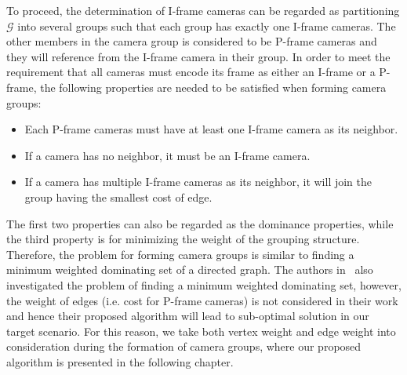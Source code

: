 To proceed, the determination of I-frame cameras can be regarded as partitioning $\mathcal{G}$ into several groups such that each group has exactly one I-frame cameras.
The other members in the camera group is considered to be P-frame cameras and they will reference from the I-frame camera in their group.
In order to meet the requirement that all cameras must encode its frame as either an I-frame or a P-frame, the following properties are needed to be satisfied when forming camera groups:
\begin{itemize}
\item Each P-frame cameras must have at least one I-frame camera as its neighbor.
\item If a camera has no neighbor, it must be an I-frame camera.
\item If a camera has multiple I-frame cameras as its neighbor, it will join the group having the smallest cost of edge.
\end{itemize}
The first two properties can also be regarded as the dominance properties, while the third property is for minimizing the weight of the grouping structure.
Therefore, the problem for forming camera groups is similar to finding a minimum weighted dominating set of a directed graph.
The authors in~\cite{MWDS_baseline} also investigated the problem of finding a minimum weighted dominating set, however, the weight of edges (i.e. cost for P-frame cameras) is not considered in their work and hence their proposed algorithm will lead to sub-optimal solution in our target scenario.
For this reason, we take both vertex weight and edge weight into consideration during the formation of camera groups, where our proposed algorithm is presented in the following chapter.
%
